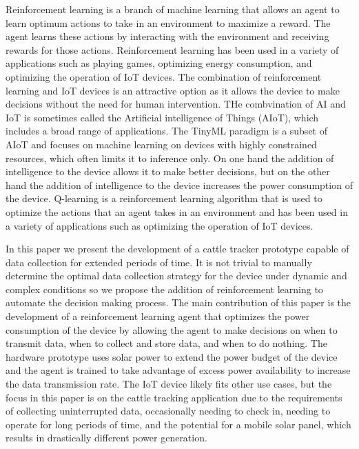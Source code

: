 \documentclass[10pt]{cai}
\begin{document}
Reinforcement learning is a branch of machine learning that allows an agent to learn optimum actions to take in an environment to maximize a reward.
The agent learns these actions by interacting with the environment and receiving rewards for those actions.
Reinforcement learning has been used in a variety of applications such as playing games, optimizing energy consumption, and optimizing the operation of IoT devices.
The combination of reinforcement learning and IoT devices is an attractive option as it allows the device to make decisions without the need for human intervention.
THe combvination of AI and IoT is sometimes called the Artificial intelligence of Things (AIoT)\cite{yamsaniIoTBasedLivestockMonitoring2024}, which includes a broad range of applications.
The TinyML paradigm is a subset of AIoT and focuses on machine learning on devices with highly constrained resources, which often limits it to inference only\cite{rayReviewTinyMLStateoftheart2022}.
On one hand the addition of intelligence to the device allows it to make better decisions, but on the other hand the addition of intelligence to the device increases the power consumption of the device.
Q-learning is a reinforcement learning algorithm that is used to optimize the actions that an agent takes in an environment and has been used in a variety of applications such as optimizing the operation of IoT devices.

In this paper we present the development of a cattle tracker prototype capable of data collection for extended periods of time.
It is not trivial to manually determine the optimal data collection strategy for the device under dynamic and complex conditions \cite{suttonReinforcementLearningIntroduction2020} so we propose the addition of reinforcement learning to automate the decision making process.
The main contribution of this paper is the development of a reinforcement learning agent that optimizes the power consumption of the device by allowing the agent to make decisions on when to transmit data, when to collect and store data, and when to do nothing.
The hardware prototype uses solar power to extend the power budget of the device and the agent is trained to take advantage of excess power availability to increase the data transmission rate.
The IoT device likely fits other use cases, but the focus in this paper is on the cattle tracking application due to the requirements of collecting uninterrupted data, occasionally needing to check in, needing to operate for long periods of time, and the potential for a mobile solar panel, which results in drastically different power generation.
\end{document}
